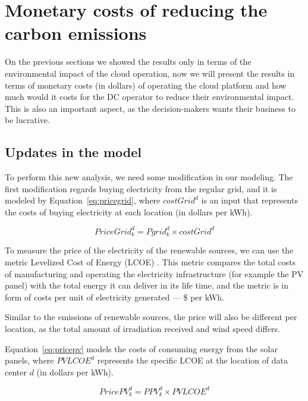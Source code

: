 \section{ Monetary costs of reducing the carbon emissions}
\label{sec:costs}
On the previous sections we showed the results only in terms of the environmental impact of the cloud operation, now we will present the results in terms of monetary costs (in dollars) of operating the cloud platform and how much would it costs for the DC operator to reduce their environmental impact. This is also an important aspect, as the decision-makers wants their business to be lucrative.

\subsection{Updates in the model}

To perform this new analysis, we need some modification in our modeling. The first modification regards buying electricity from the regular grid, and it is modeled by Equation~\eqref{eq:pricegrid}, where $costGrid^d$ is an input that represents the costs of buying electricity at each location (in dollars per kWh). 

\begin{equation} \label{eq:pricegrid}
 PriceGrid^d_k = Pgrid^d_k \times costGrid^d
\end{equation}

To measure the price of the electricity of the renewable sources, we can use the metric Levelized Cost of Energy (LCOE) \cite{nrel_economic_wt_1995}. This metric compares the total costs of manufacturing and operating the electricity infrastructure (for example the PV panel) with the total energy it can deliver in its life time, and the metric is in form of costs per unit of electricity generated ---  \$ per kWh.

Similar to the  emissions of renewable sources, the price will also be different per location, as the total amount of irradiation received and wind speed differs.

Equation~\eqref{eq:pricepv} models the costs of consuming energy from the solar panels, where $PVLCOE^d$ represents the specific LCOE at the location of data center $d$ (in dollars per kWh).

\begin{equation} \label{eq:pricepv}
  PricePV^d_k = PPV^d_k \times PVLCOE^d
\end{equation}


